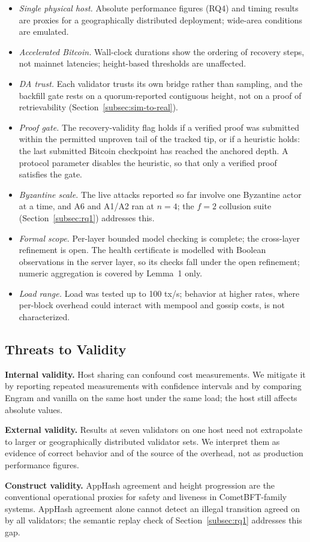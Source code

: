 \begin{itemize}
  \item \emph{Single physical host.} Absolute performance figures (RQ4) and
  timing results are proxies for a geographically distributed deployment;
  wide-area conditions are emulated.
  \item \emph{Accelerated Bitcoin.} Wall-clock durations show the ordering
  of recovery steps, not mainnet latencies; height-based thresholds are
  unaffected.
  \item \emph{DA trust.} Each validator trusts its own bridge rather than
  sampling, and the backfill gate rests on a quorum-reported contiguous
  height, not on a proof of retrievability (Section~\ref{subsec:sim-to-real}).
  \item \emph{Proof gate.} The recovery-validity flag holds if a verified
  proof was submitted within the permitted unproven tail of the tracked tip,
  or if a heuristic holds: the last submitted Bitcoin checkpoint has reached
  the anchored depth. A protocol parameter disables the heuristic, so that
  only a verified proof satisfies the gate.
  \item \emph{Byzantine scale.} The live attacks reported so far involve one
  Byzantine actor at a time, and A6 and A1/A2 ran at $n{=}4$; the $f{=}2$
  collusion suite (Section~\ref{subsec:rq1}) addresses this.
  \item \emph{Formal scope.} Per-layer bounded model checking is complete;
  the cross-layer refinement is open. The health certificate is modelled
  with Boolean observations in the server layer, so its checks fall under
  the open refinement; numeric aggregation is covered by Lemma~1 only.
  \item \emph{Load range.} Load was tested up to 100 tx/s; behavior at
  higher rates, where per-block overhead could interact with mempool and
  gossip costs, is not characterized.
\end{itemize}

\subsection{Threats to Validity}

\textbf{Internal validity.} Host sharing can confound cost measurements. We
mitigate it by reporting repeated measurements with confidence intervals and
by comparing Engram and vanilla on the same host under the same load; the
host still affects absolute values.

\textbf{External validity.} Results at seven validators on one host need not
extrapolate to larger or geographically distributed validator sets. We
interpret them as evidence of correct behavior and of the source of the
overhead, not as production performance figures.

\textbf{Construct validity.} AppHash agreement and height progression are
the conventional operational proxies for safety and liveness in
CometBFT-family systems. AppHash agreement alone cannot detect an illegal
transition agreed on by all validators; the semantic replay check of
Section~\ref{subsec:rq1} addresses this gap.
